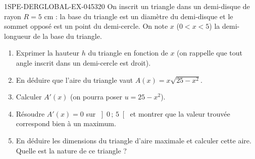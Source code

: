 \begin{exercice}{1SPE-DERGLOBAL-EX-045}{3}{20}
On inscrit un triangle dans un demi-disque de rayon $R = 5$ cm : la base du triangle
est un diamètre du demi-disque et le sommet opposé est un point du demi-cercle.
On note $x$ ($0 < x < 5$) la demi-longueur de la base du triangle.

\begin{enumerate}
  \item Exprimer la hauteur $h$ du triangle en fonction de $x$ (on rappelle que
        tout angle inscrit dans un demi-cercle est droit).
  \item En déduire que l'aire du triangle vaut $A(x) = x\sqrt{25 - x^2}$.
  \item Calculer $A'(x)$ (on pourra poser $u = 25 - x^2$).
  \item Résoudre $A'(x) = 0$ sur $\left]0\,;\,5\right[$ et montrer que la valeur
        trouvée correspond bien à un maximum.
  \item En déduire les dimensions du triangle d'aire maximale et calculer cette aire.
        Quelle est la nature de ce triangle ?
\end{enumerate}
\end{exercice}
